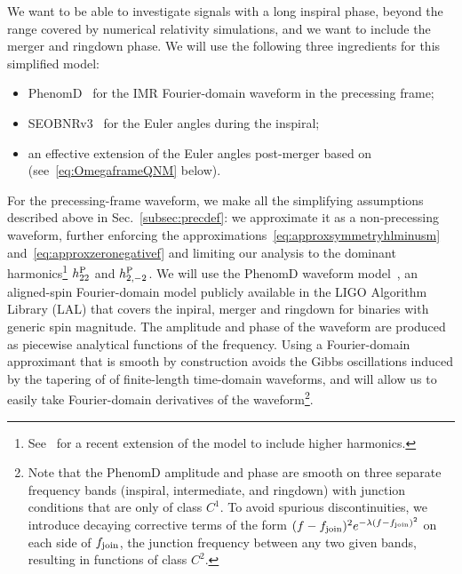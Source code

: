 \documentclass[aps,showpacs,twocolumn,
prd,superscriptaddress,nofootinbib]{revtex4-1}
\begin{document}

We want to be able to investigate signals with a long inspiral phase, beyond the range covered by numerical relativity simulations, and we want to include the merger and ringdown phase. We will use the following three ingredients for this simplified model:
\begin{itemize}
	\item PhenomD~\cite{Husa+15, Khan+15} for the IMR Fourier-domain waveform in the precessing frame;
	\item SEOBNRv3~\cite{Pan+13, BTB16} for the Euler angles during the inspiral;
	\item an effective extension of the Euler angles post-merger based on~\cite{OShaughnessy+12} (see~\eqref{eq:OmegaframeQNM} below).
\end{itemize}

For the precessing-frame waveform, we make all the simplifying assumptions described above in Sec.~\ref{subsec:precdef}: we approximate it as a non-precessing waveform, further enforcing the approximations~\eqref{eq:approxsymmetryhlminusm} and~\eqref{eq:approxzeronegativef} and limiting our analysis to the dominant harmonics\footnote{See~\cite{London+17} for a recent extension of the model to include higher harmonics.} $h^{\rm P}_{22}$ and $h^{\rm P}_{2,-2}$. We will use the PhenomD waveform model~\cite{Husa+15, Khan+15}, an aligned-spin Fourier-domain model publicly available in the LIGO Algorithm Library (LAL) that covers the inpiral, merger and ringdown for binaries with generic spin magnitude. The amplitude and phase of the waveform are produced as piecewise analytical functions of the frequency. Using a Fourier-domain approximant that is smooth by construction avoids the Gibbs oscillations induced by the tapering of of finite-length time-domain waveforms, and will allow us to easily take Fourier-domain derivatives of the waveform\footnote{Note that the PhenomD amplitude and phase are smooth on three separate frequency bands (inspiral, intermediate, and ringdown) with junction conditions that are only of class $C^{1}$. To avoid spurious discontinuities, we introduce decaying corrective terms of the form $(f-f_{\rm join})^{2} e^{-\lambda(f-f_{\rm join})^{2}}$ on each side of $f_{\rm join}$, the junction frequency between any two given bands, resulting in functions of class $C^{2}$.}.
\end{document}
